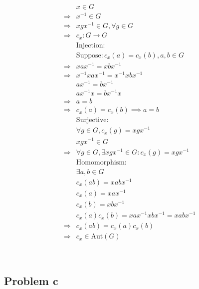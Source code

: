 \documentclass{article}
\begin{document}
\begin{equation*}
    \begin{split}
        &x\in G\\
        \Rightarrow&x^{-1}\in G\\
        \Rightarrow&xgx^{-1}\in G,\forall g\in G\\
        \Rightarrow&c_x:G\rightarrow G\\
        &\text{Injection}:\\
        &\text{Suppose}:c_x(a)=c_x(b),a,b\in G\\
        \Rightarrow&xax^{-1}=xbx^{-1}\\
        \Rightarrow&x^{-1}xax^{-1}=x^{-1}xbx^{-1}\\
        &ax^{-1}=bx^{-1}\\
        &ax^{-1}x=bx^{-1}x\\
        \Rightarrow&a=b\\
        \Rightarrow&c_x(a)=c_x(b)\implies a=b\\
        &\text{Surjective}:\\
        &\forall g\in G, c_x(g)=xgx^{-1}\\
        &xgx^{-1}\in G\\
        \Rightarrow&\forall g\in G,\exists xgx^{-1}\in G:c_x(g)=xgx^{-1}\\
        &\text{Homomorphism}:\\
        &\exists a,b\in G\\
        &c_x(ab)=xabx^{-1}\\
        &c_x(a)=xax^{-1}\\
        &c_x(b)=xbx^{-1}\\
        &c_x(a)c_x(b)=xax^{-1}xbx^{-1}=xabx^{-1}\\
        \Rightarrow&c_x(ab)=c_x(a)c_x(b)\\
        \Rightarrow&c_x\in \text{Aut}(G)
    \end{split}
\end{equation*}

~

\subsection*{Problem c}

~
\end{document}
